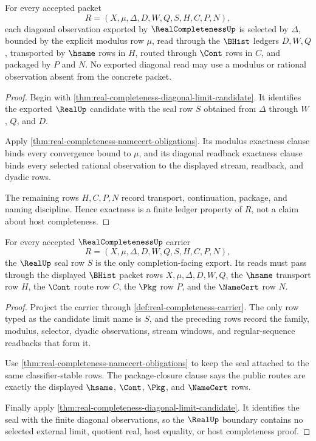 \begin{theorem}
\label{thm:real-completeness-modulus-diagonal-exactness}
For every accepted packet
$$
R=(X,\mu,\Delta,D,W,Q,S,H,C,P,N),
$$
each diagonal observation exported by $\RealCompletenessUp$ is selected by $\Delta$, bounded by the explicit modulus row $\mu$, read through the $\BHist$ ledgers $D,W,Q$, transported by $\hsame$ rows in $H$, routed through $\Cont$ rows in $C$, and packaged by $P$ and $N$. No exported diagonal read may use a modulus or rational observation absent from the concrete packet.
\end{theorem}
\begin{proof}
Begin with \autoref{thm:real-completeness-diagonal-limit-candidate}. It identifies the exported $\RealUp$ candidate with the seal row $S$ obtained from $\Delta$ through $W$, $Q$, and $D$.

Apply \autoref{thm:real-completeness-namecert-obligations}. Its modulus exactness clause binds every convergence bound to $\mu$, and its diagonal readback exactness clause binds every selected rational observation to the displayed stream, readback, and dyadic rows.

The remaining rows $H,C,P,N$ record transport, continuation, package, and naming discipline. Hence exactness is a finite ledger property of $R$, not a claim about host completeness.
\end{proof}

\begin{theorem}
\label{thm:real-completeness-realup-seal-ledger}
For every accepted $\RealCompletenessUp$ carrier
$$
R=(X,\mu,\Delta,D,W,Q,S,H,C,P,N),
$$
the $\RealUp$ seal row $S$ is the only completion-facing export. Its reads must pass through the displayed $\BHist$ packet rows $X,\mu,\Delta,D,W,Q$, the $\hsame$ transport row $H$, the $\Cont$ route row $C$, the $\Pkg$ row $P$, and the $\NameCert$ row $N$.
\end{theorem}
\begin{proof}
Project the carrier through \autoref{def:real-completeness-carrier}. The only row typed as the candidate limit name is $S$, and the preceding rows record the family, modulus, selector, dyadic observations, stream windows, and regular-sequence readbacks that form it.

Use \autoref{thm:real-completeness-namecert-obligations} to keep the seal attached to the same classifier-stable rows. The package-closure clause says the public routes are exactly the displayed $\hsame$, $\Cont$, $\Pkg$, and $\NameCert$ rows.

Finally apply \autoref{thm:real-completeness-diagonal-limit-candidate}. It identifies the seal with the finite diagonal observations, so the $\RealUp$ boundary contains no selected external limit, quotient real, host equality, or host completeness proof.
\end{proof}

